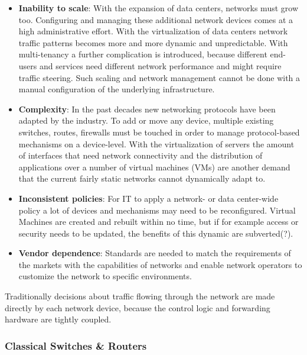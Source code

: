\begin{itemize}
\item \textbf{Inability to scale}: With the expansion of data centers, networks must grow too. Configuring and managing these additional network devices comes at a high administrative effort. With the virtualization of data centers network traffic patterns becomes more and more dynamic and unpredictable. With multi-tenancy a further complication is introduced, because different end-users and services need different network performance and might require traffic steering. Such scaling and network management cannot be done with a manual configuration of the underlying infrastructure.
\item \textbf{Complexity}: In the past decades new networking protocols have been adapted by the industry. To add or move any device, multiple existing switches, routes, firewalls must be touched in order to manage protocol-based mechanisms on a device-level. With the virtualization of servers the amount of interfaces that need network connectivity and the distribution of applications over a number of virtual machines (VMs) are another demand that the current fairly static networks cannot dynamically adapt to.
\item \textbf{Inconsistent policies}: For IT to apply a network- or data center-wide policy a lot of devices and mechanisms may need to be reconfigured. Virtual Machines are created and rebuilt within no time, but if for example access or security needs to be updated, the benefits of this dynamic are subverted(?).
\item \textbf{Vendor dependence}: Standards are needed to match the requirements of the markets with the capabilities of networks and enable network operators to customize the network to specific environments.
\end{itemize}

Traditionally decisions about traffic flowing through the network are made directly by each network device, because the control logic and forwarding hardware are tightly coupled.

\subsubsection{Classical Switches \& Routers}

